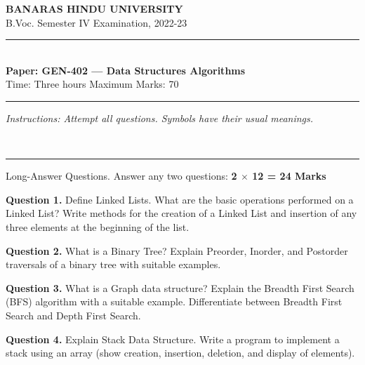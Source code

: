 \documentclass[11pt,a4paper]{article}
\begin{document}
\begin{center}
  {\large\bfseries BANARAS HINDU UNIVERSITY}\\[2pt]
  {
\normalsize B.Voc. Semester IV Examination, 2022-23}\\[6pt]
  \rule{0.8\linewidth}{0.5pt}\\[6pt]
  {\large\bfseries Paper: GEN-402 --- Data Structures Algorithms}\\[4pt]
  {
\normalsize Time: Three hours \hfill Maximum Marks: 70}
\end{center}

\rule{\linewidth}{0.4pt}

\smallskip



\noindent   \textit{Instructions: Attempt all questions. Symbols have their usual meanings.}

\bigskip




\\[4pt]
\rule{\linewidth}{0.4pt}\smallskip

Long-Answer Questions. Answer any two questions: \hfill   \textbf{2 $ \times$ 12 = 24 Marks}

\medskip



\noindent   \textbf{Question 1.} Define Linked Lists. What are the basic operations performed on a Linked List? Write methods for the creation of a Linked List and insertion of any three elements at the beginning of the list.

\medskip



\noindent   \textbf{Question 2.} What is a Binary Tree? Explain Preorder, Inorder, and Postorder traversals of a binary tree with suitable examples.

\medskip



\noindent   \textbf{Question 3.} What is a Graph data structure? Explain the Breadth First Search (BFS) algorithm with a suitable example. Differentiate between Breadth First Search and Depth First Search.

\medskip



\noindent   \textbf{Question 4.} Explain Stack Data Structure. Write a program to implement a stack using an array (show creation, insertion, deletion, and display of elements).

\bigskip
\end{document}
